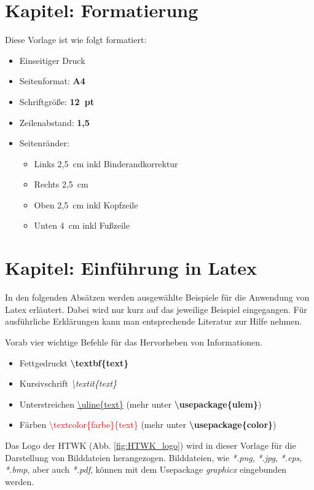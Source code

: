 \newpage
\chapter{Kapitel: Formatierung}

Diese Vorlage ist wie folgt formatiert:
\begin{itemize}
    \item Einseitiger Druck
    \item Seitenformat: \textbf{A4}
    \item Schriftgröße: \textbf{12~pt}
    \item Zeilenabstand: \textbf{1,5}
    \item Seitenränder: \begin{itemize}
        \item Links 2,5~cm \gls{inkl} Binderandkorrektur
        \item Rechts 2,5~cm
        \item Oben 2,5~cm \gls{inkl} Kopfzeile
        \item Unten 4~cm \gls{inkl} Fußzeile
    \end{itemize}
\end{itemize}


\newpage
\chapter{Kapitel: Einführung in Latex}

In den folgenden Absätzen werden ausgewählte Beispiele für die Anwendung von Latex erläutert. Dabei wird nur kurz auf das jeweilige Beispiel eingegangen. Für ausführliche Erklärungen kann man entsprechende Literatur zur Hilfe nehmen.

Vorab vier wichtige Befehle für das Hervorheben von Informationen.
\begin{itemize}
    \item Fettgedruckt \textbf{\textbackslash textbf\{text\}}
    \item Kursivschrift \textit{\textbackslash textit\{text\}}
    \item Unterstreichen \uline{\textbackslash uline\{text\}} (mehr unter \textbf{\textbackslash usepackage\{ulem\}})
    \item Färben \textcolor{red}{\textbackslash textcolor\{farbe\}\{text\}} (mehr unter \textbf{\textbackslash usepackage\{color\}})
\end{itemize}

\vspace{2 cm}       %
Das Logo der HTWK (Abb. \ref{fig:HTWK_logo}) wird in dieser Vorlage für die Darstellung von Bilddateien herangezogen. Bilddateien, wie \textit{*.png}, \textit{*.jpg}, \textit{*.eps}, \textit{*.bmp}, aber auch \textit{*.pdf}, können mit dem Usepackage \textit{graphicx} eingebunden werden.


